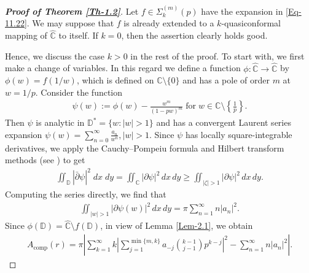 \documentclass[a4paper,12pt]{amsart}
\theoremstyle{plain}
\theoremstyle{definition}
\begin{document}
\begin{proof}[\bf {Proof of Theorem \ref{Th-1.2}}]
Let $f \in \Sigma_k^{(m)}(p)$ have the expansion in \eqref{Eq-11.22}. We may suppose that $f$ is already extended to a $k$-quasiconformal mapping of $\widehat{\mathbb{C}}$ to itself.
 If $k=0$, then the assertion clearly holds good.

 Hence, we discuss the case $k>0$ in the rest of the proof. To start with, we first make a change of variables. In this regard we define a function $\phi : \widehat{\mathbb{C}}\to \widehat{\mathbb{C}}$ by  $\phi(w) = f(1/w)$, which is defined on $\mathbb{C} \setminus \{0\}$ and has a pole of order $m$ at $w = 1/p$. Consider the function
\begin{align*}
	\psi(w) := \phi(w) - \frac{w^m}{(1 - p w)^m}\;\mbox{for}\; w \in \mathbb{C} \setminus \left\{ \frac{1}{p} \right\}.
\end{align*}
Then $\psi$ is analytic in $\mathbb{D}^* = \{ w : |w| > 1 \}$ and has a convergent Laurent series expansion $\psi(w) = \sum_{n=0}^\infty \frac{a_n}{w^n}, |w| > 1.$ Since $\psi$ has locally square-integrable derivatives, we apply the Cauchy–Pompeiu formula and Hilbert transform methods (see \cite{Lehto-Virtanen-1973}) to get
\begin{align*}
	\iint_{\mathbb{D}} |\bar{\partial} \psi|^2 \; dx \; dy = \iint_{\mathbb{C}} |\partial \psi|^2 \, dx\,dy \geq \iint_{|\zeta| > 1} |\partial \psi|^2 \, dx\,dy.
\end{align*}
Computing the series directly, we find that
\begin{align*}
	\iint_{|w| > 1} |\partial \psi(w)|^2 \, dx\,dy = \pi \sum_{n=1}^\infty n |a_n|^2.
\end{align*}
Since $\phi(\mathbb{D}) = \widehat{\mathbb{C}} \setminus f(\mathbb{D})$, in view of Lemma \ref{Lem-2.1}, we obtain
\begin{align*}
	A_{\text{comp}}(r) = \pi \left| \sum_{k=1}^{\infty} k \left| \sum_{j=1}^{\min\{m, k\}} a_{-j} \binom{k-1}{j-1} p^{k-j} \right|^2 - \sum_{n=1}^{\infty} n |a_{n}|^2 \right|.
\end{align*}


\end{proof}
\end{document}

